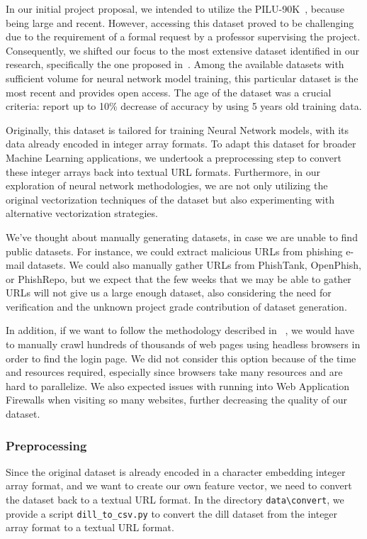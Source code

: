 \documentclass{article}
\begin{document}
    In our initial project proposal, we intended to utilize the PILU-90K~\cite{PhishingURLDetection}, because being large and recent.
    However, accessing this dataset proved to be challenging due to the requirement of a formal request by a professor supervising the project.
    Consequently, we shifted our focus to the most extensive dataset identified in our research, specifically the one proposed in~\cite{VisualizingRNNInURLDetection}.
    Among the available datasets with sufficient volume for neural network model training, this particular dataset is the most recent and provides open access.
    The age of the dataset was a crucial criteria:\cite{PhishingLoginURLDetection} report up to 10\% decrease of accuracy by using 5 years old training data.

    Originally, this dataset is tailored for training Neural Network models, with its data already encoded in integer array formats.
    To adapt this dataset for broader Machine Learning applications, we undertook a preprocessing step to convert these integer arrays back into textual URL formats.
    Furthermore, in our exploration of neural network methodologies, we are not only utilizing the original vectorization techniques of the dataset but also experimenting with alternative vectorization strategies.

    We've thought about manually generating datasets, in case we are unable to find public datasets.
    For instance, we could extract malicious URLs from phishing e-mail datasets.
    We could also manually gather URLs from PhishTank, OpenPhish, or PhishRepo, but we expect that the few weeks that we may be able to gather URLs will not give us a large enough dataset, also considering the need for verification and the unknown project grade contribution of dataset generation.

    In addition, if we want to follow the methodology described in ~\cite{PhishingLoginURLDetection}, we would have to manually crawl hundreds of thousands of web pages using headless browsers in order to find the login page.
    We did not consider this option because of the time and resources required, especially since browsers take many resources and are hard to parallelize.
    We also expected issues with running into Web Application Firewalls when visiting so many websites, further decreasing the quality of our dataset.

    \subsubsection{Preprocessing}\label{subsubsec:preprocessing}
    Since the original dataset is already encoded in a character embedding integer array format, and we want to create our own feature vector, we need to convert the dataset back to a textual URL format.
    In the directory \texttt{data\textbackslash convert}, we provide a script \texttt{dill\_to\_csv.py} to convert the dill dataset from the integer array format to a textual URL format.
\end{document}
